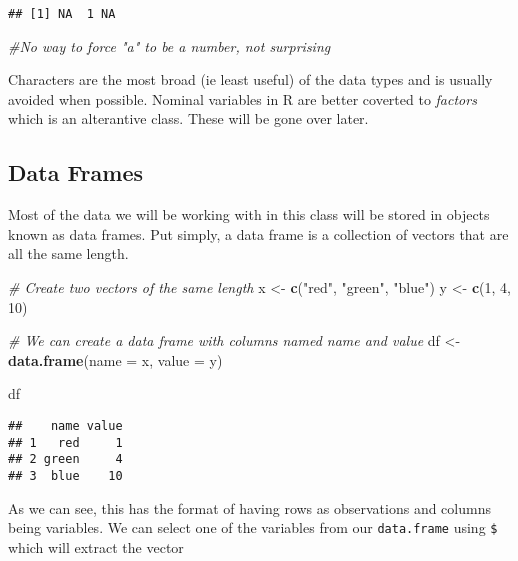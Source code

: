 \documentclass[
]{article}
\newenvironment{Shaded}{\begin{snugshade}}{\end{snugshade}}
\newcommand{\AttributeTok}[1]{\textcolor[rgb]{0.13,0.29,0.53}{#1}}
\newcommand{\CommentTok}[1]{\textcolor[rgb]{0.56,0.35,0.01}{\textit{#1}}}
\newcommand{\DecValTok}[1]{\textcolor[rgb]{0.00,0.00,0.81}{#1}}
\newcommand{\FunctionTok}[1]{\textcolor[rgb]{0.13,0.29,0.53}{\textbf{#1}}}
\newcommand{\NormalTok}[1]{#1}
\newcommand{\OtherTok}[1]{\textcolor[rgb]{0.56,0.35,0.01}{#1}}
\newcommand{\StringTok}[1]{\textcolor[rgb]{0.31,0.60,0.02}{#1}}
\begin{document}
\begin{verbatim}
## [1] NA  1 NA
\end{verbatim}

\begin{Shaded}
\begin{Highlighting}[]
\CommentTok{\#No way to force "a" to be a number, not surprising}
\end{Highlighting}
\end{Shaded}

Characters are the most broad (ie least useful) of the data types and is
usually avoided when possible. Nominal variables in R are better
coverted to \emph{factors} which is an alterantive class. These will be
gone over later.

\subsection{Data Frames}\label{data-frames}

Most of the data we will be working with in this class will be stored in
objects known as data frames. Put simply, a data frame is a collection
of vectors that are all the same length.

\begin{Shaded}
\begin{Highlighting}[]
\CommentTok{\# Create two vectors of the same length}
\NormalTok{x }\OtherTok{\textless{}{-}} \FunctionTok{c}\NormalTok{(}\StringTok{"red"}\NormalTok{, }\StringTok{"green"}\NormalTok{, }\StringTok{"blue"}\NormalTok{)}
\NormalTok{y }\OtherTok{\textless{}{-}} \FunctionTok{c}\NormalTok{(}\DecValTok{1}\NormalTok{, }\DecValTok{4}\NormalTok{, }\DecValTok{10}\NormalTok{)}

\CommentTok{\# We can create a data frame with columns named \textasciigrave{}name\textasciigrave{} and \textasciigrave{}value\textasciigrave{}}
\NormalTok{df }\OtherTok{\textless{}{-}} \FunctionTok{data.frame}\NormalTok{(}\AttributeTok{name =}\NormalTok{ x, }\AttributeTok{value =}\NormalTok{ y)}

\NormalTok{df}
\end{Highlighting}
\end{Shaded}

\begin{verbatim}
##    name value
## 1   red     1
## 2 green     4
## 3  blue    10
\end{verbatim}

As we can see, this has the format of having rows as observations and
columns being variables. We can select one of the variables from our
\texttt{data.frame} using \texttt{\$} which will extract the vector
\end{document}
